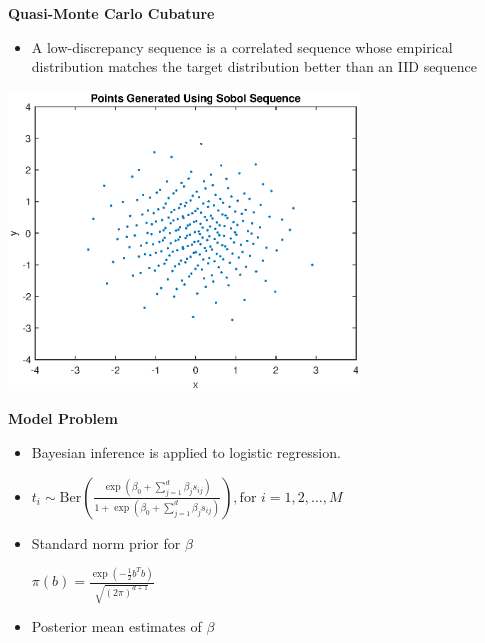 \documentclass[final,mathserif]{beamer}
\newcommand{\blue}[1]{{\color{myblue}#1}}
\renewcommand{\blue}{\textcolor{blue!80!black}}
\begin{document}
\begin{frame}[fragile]
\begin{columns}[t]
\begin{column}{.31\linewidth}
\begin{block} {\Large \textbf{\blue {Quasi-Monte Carlo Cubature}}}
\begin{itemize}
\item A \alert{low-discrepancy sequence} is a \alert{correlated} sequence whose empirical distribution matches the target distribution better than an IID sequence

\end{itemize}
\begin{center}
\includegraphics[width=0.7\textwidth]{SobolPoints}
\end{center}
\end{block}

\vspace{.1in}

\begin{block}{\Large \textbf{\blue {Model Problem}}}
\vspace{.1in}
\begin{itemize}
\item Bayesian inference is applied to logistic regression.

\item $t_i \sim \text{Ber} \left(\frac{\exp{\left(\beta_0+\sum_{j=1}^d\beta_j s_{ij}\right)}} {1+\exp \left({{\beta_0+\sum_{j=1}^d\beta_js_{ij}}}\right)}\right), \text{for } i=1, 2, \dots , M$

\vspace{.05in}

\item Standard norm prior for $\beta$

\vspace{.05in}

$\pi(b)=\frac{\exp{\left({-\frac{1}{2}b^Tb}\right )}}{\sqrt{(2\pi)^{d+1}}}$

\vspace{.05in}

\item Posterior mean estimates of $\beta$


\end{itemize}
\end{block}
\end{column}
\end{columns}
\end{frame}
\end{document}
